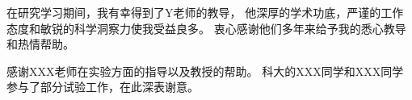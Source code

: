 \begin{acknowledgements}

在研究学习期间，我有幸得到了Y老师的教导，
他深厚的学术功底，严谨的工作态度和敏锐的科学洞察力使我受益良多。
衷心感谢他们多年来给予我的悉心教导和热情帮助。

感谢XXX老师在实验方面的指导以及教授的帮助。
科大的XXX同学和XXX同学参与了部分试验工作，在此深表谢意。

\end{acknowledgements}
